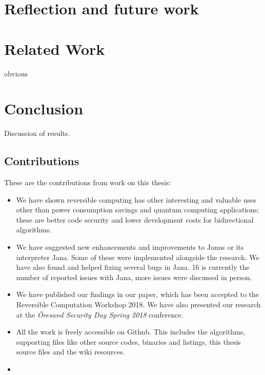 \documentclass[a4paper,10pt,openright]{memoir}
\newcommand{\term}[1]{\textit{#1}}
\begin{document}
\chapter{Reflection and future work}





\chapter{Related Work}

obvious

\chapter{Conclusion}

Discussion of results.

\section{Contributions}

These are the contributions from work on this thesis:

\begin{itemize}

\item We have shown reversible computing has other interesting and 
valuable uses other than power consumption savings and quantum 
computing applications; these are better code security and lower 
development costs for bidirectional algorithms.

\item We have suggested new enhancements and improvements to Janus or 
its interpreter Jana. Some of these were implemented alongside the 
research. We have also found and helped fixing several bugs in Jana. 16 
is currently the number of reported issues with Jana, more issues were 
discussed in person.

\item We have published our findings in our paper\cite{revcry-paper}, which 
has been accepted to the Reversible Computation Workshop 2018. We have 
also presented our research at the \term{Öresund Security Day Spring 
2018} conference.

\item All the work is freely accessible on 
Github\cite{revcry-github}. This includes the algorithms, 
supporting files like other source codes, binaries and listings, this 
thesis source files and the wiki resources.

\item {}

\end{itemize}
\end{document}
